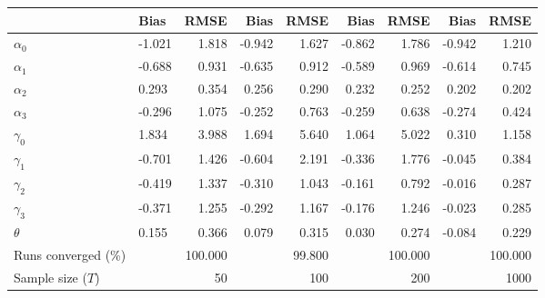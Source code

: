 
\begin{tabular}[t]{llrrrrrrr}
\toprule
  & Bias & RMSE & Bias & RMSE & Bias & RMSE & Bias & RMSE\\
\midrule
$\alpha_{0}$ & -1.021 & 1.818 & -0.942 & 1.627 & -0.862 & 1.786 & -0.942 & 1.210\\
$\alpha_{1}$ & -0.688 & 0.931 & -0.635 & 0.912 & -0.589 & 0.969 & -0.614 & 0.745\\
$\alpha_{2}$ & 0.293 & 0.354 & 0.256 & 0.290 & 0.232 & 0.252 & 0.202 & 0.202\\
$\alpha_{3}$ & -0.296 & 1.075 & -0.252 & 0.763 & -0.259 & 0.638 & -0.274 & 0.424\\
$\gamma_{0}$ & 1.834 & 3.988 & 1.694 & 5.640 & 1.064 & 5.022 & 0.310 & 1.158\\
$\gamma_{1}$ & -0.701 & 1.426 & -0.604 & 2.191 & -0.336 & 1.776 & -0.045 & 0.384\\
$\gamma_{2}$ & -0.419 & 1.337 & -0.310 & 1.043 & -0.161 & 0.792 & -0.016 & 0.287\\
$\gamma_{3}$ & -0.371 & 1.255 & -0.292 & 1.167 & -0.176 & 1.246 & -0.023 & 0.285\\
$\theta$ & 0.155 & 0.366 & 0.079 & 0.315 & 0.030 & 0.274 & -0.084 & 0.229\\
Runs converged (\%) &  & 100.000 &  & 99.800 &  & 100.000 &  & 100.000\\
Sample size ($T$) &  & 50 &  & 100 &  & 200 &  & 1000\\
\bottomrule
\end{tabular}
